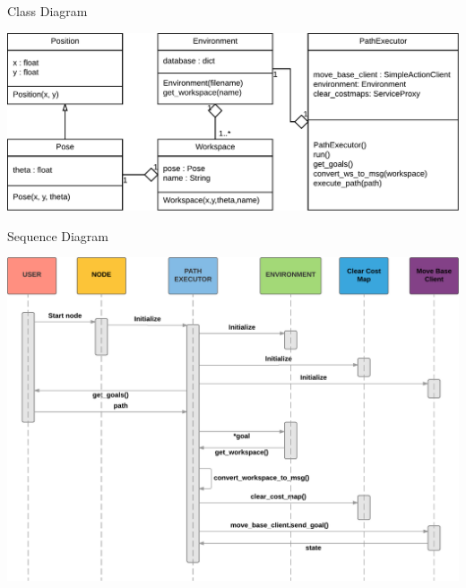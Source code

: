 \begin{frame}{Class Diagram}
    \begin{center}
        \includegraphics[width=\linewidth,height=\textheight,keepaspectratio]{gfx/01.pdf}
    \end{center}
\end{frame}


\begin{frame}{Sequence Diagram}
    \begin{center}
        \includegraphics[width=\linewidth,height=0.9\textheight,keepaspectratio]{gfx/02.pdf}
    \end{center}
\end{frame}